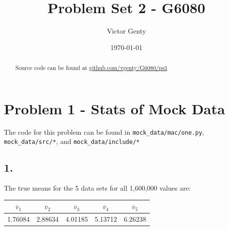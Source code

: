 \documentclass[singlepage,notitlepage,nofootinbib,11pt]{revtex4-1}
\begin{document}
\title{Problem Set 2 - G6080}
\author{Victor Genty}
\date{\today}
\begin{abstract}
\centering
Source code can be found at \href{https://github.com/vgenty/G6080/tree/master/ps3}{github.com/vgenty/G6080/ps3}
\end{abstract}
\maketitle
\section{Problem 1 - Stats of Mock Data}
\begin{center}The code for this problem can be found in \verb|mock_data/mac/one.py|, \verb|mock_data/src/*|, and \verb|mock_data/include/*| \end{center}
\subsection{1.}
The true means for the 5 data sets for all 1,600,000 values are:
\begin{center}
\begin{tabular}{ | c | c | c | c | c |}\hline
  $\overline{v}_1$ &  $\overline{v}_2$ &  $\overline{v}_3$ &  $\overline{v}_4$ &  $\overline{v}_5$  \\ \hline \hline 
  1.76084 & 2.88634 & 4.01185 & 5.13712 & 6.26238 \\ \hline
\end{tabular}
\end{center}
\end{document}
